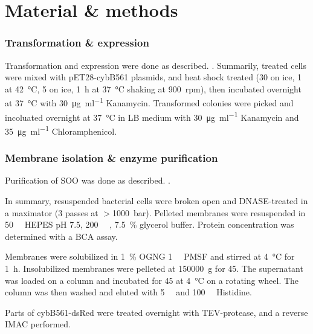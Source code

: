 \twocolumn

\part{Material \& methods}

\section{Transformation \& expression}

\small

Transformation and expression were done as described.
\cite{superoxide_salvaging}. Summarily,  treated cells were mixed
with pET28-cybB561 plasmids, and heat shock treated (\SI{30}{\min} on ice,
\SI{1}{\min} at \SI{42}{\celsius}, \SI{5}{\min} on ice, \SI{1}{\hour} at
\SI{37}{\celsius} shaking at \SI{900}{rpm}), then incubated overnight at
\SI{37}{\celsius} with \SI{30}{\ug\per\ml} Kanamycin. Transformed colonies were
picked and incoluated overnight at \SI{37}{\celsius} in LB medium with
\SI{30}{\ug\per\ml} Kanamycin and \SI{35}{\ug\per\ml} Chloramphenicol.


\section{Membrane isolation \& enzyme purification}

Purification of SOO was done as described. \cite{superoxide_salvaging}.

In summary, resuspended bacterial cells were broken open and DNASE-treated in a
maximator (3 passes at $>$\SI{1000}{\bar}). Pelleted membranes were resuspended
in \SI{50}{\milli\Molar} HEPES pH 7.5, \SI{200}{\milli\Molar} ,
\SI{7.5}{\percent} glycerol buffer. Protein concentration was determined with a
BCA assay.

Membranes were solubilized in \SI{1}{\percent} OGNG \SI{1}{\milli\Molar} PMSF
and stirred at \SI{4}{\celsius} for \SI{1}{\hour}. Insolubilized membranes were
pelleted at \SI{150000}{g} for \SI{45}{\min}. The supernatant was loaded on a
 column and incubated for \SI{45}{\min} at \SI{4}{\celsius} on a
rotating wheel. The column was then washed and eluted with \SI{5}{\milli\Molar}
and \SI{100}{\milli\Molar} Histidine.

Parts of cybB561-dsRed were treated overnight with TEV-protease, and a reverse
 IMAC performed.

